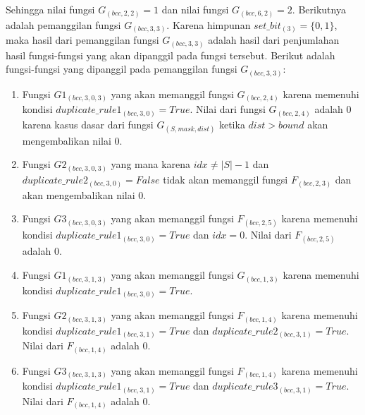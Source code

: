 Sehingga nilai fungsi $ G_{(bcc, 2, 2)}=1 $ dan nilai fungsi $ G_{(bcc, 6, 2)}=2 $. Berikutnya adalah pemanggilan fungsi $ G_{(bcc, 3, 3)} $. Karena himpunan $ set\_bit_{(3)} = \{0, 1\} $, maka hasil dari pemanggilan fungsi $ G_{(bcc, 3, 3)} $ adalah hasil dari penjumlahan hasil fungsi-fungsi yang akan dipanggil pada fungsi tersebut. Berikut adalah fungsi-fungsi yang dipanggil pada pemanggilan fungsi $ G_{(bcc, 3, 3)} $:
\begin{enumerate}
	\item Fungsi $ G1_{(bcc, 3, 0, 3)} $ yang akan memanggil fungsi $ G_{(bcc, 2, 4)} $ karena memenuhi kondisi $ duplicate\_rule1_{(bcc, 3, 0)} = True$. Nilai dari fungsi $ G_{(bcc, 2, 4)} $ adalah $ 0 $ karena kasus dasar dari fungsi $ G_{(S, mask, dist)} $ ketika $ dist>bound $ akan mengembalikan nilai $ 0 $.
	
	\item Fungsi $ G2_{(bcc, 3, 0, 3)} $ yang mana karena $ idx \neq |S|-1 $ dan $ duplicate\_rule2_{(bcc, 3, 0)} = False$ tidak akan memanggil fungsi $ F_{(bcc, 2, 3)} $ dan akan mengembalikan nilai $ 0 $.
	 
	\item Fungsi $ G3_{(bcc, 3, 0, 3)} $ yang akan memanggil fungsi $ F_{(bcc, 2, 5)} $ karena memenuhi kondisi $ duplicate\_rule1_{(bcc, 3, 0)} = True $ dan $ idx = 0 $. Nilai dari $ F_{(bcc, 2, 5)}  $ adalah $ 0 $.
	
	\item Fungsi $ G1_{(bcc, 3, 1, 3)} $ yang akan memanggil fungsi $ G_{(bcc, 1, 3)} $ karena memenuhi kondisi $ duplicate\_rule1_{(bcc, 3, 0)} = True $.
	 
	\item Fungsi $ G2_{(bcc, 3, 1, 3)} $ yang akan memanggil fungsi $ F_{(bcc, 1, 4)} $ karena memenuhi kondisi $ duplicate\_rule1_{(bcc, 3, 1)} = True $ dan $ duplicate\_rule2_{(bcc, 3, 1)} = True $. Nilai dari $ F_{(bcc, 1, 4)}  $ adalah $ 0 $.
	 
	\item Fungsi $ G3_{(bcc, 3, 1, 3)} $ yang akan memanggil fungsi $ F_{(bcc, 1, 4)} $ karena memenuhi kondisi $ duplicate\_rule1_{(bcc, 3, 1)} = True $ dan $ duplicate\_rule3_{(bcc, 3, 1)} = True $. Nilai dari $ F_{(bcc, 1, 4)}  $ adalah $ 0 $.	
\end{enumerate}

